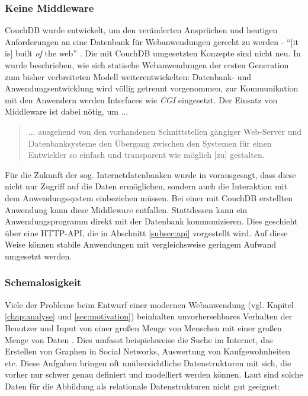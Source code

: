\subsubsection{Keine Middleware}

CouchDB wurde entwickelt, um den veränderten Ansprüchen und heutigen Anforderungen an eine Datenbank für Webanwendungen gerecht zu werden - \enquote{[it is] built \textit{of} the web} \cite{couch:oftheweb}. Die mit CouchDB umgesetzten Konzepte sind nicht neu. In  wurde beschrieben, wie sich statische Webanwendungen der ersten Generation zum bisher verbreiteten Modell weiterentwickelten: Datenbank- und Anwendungsentwicklung wird völlig getrennt vorgenommen, zur Kommunikation mit den Anwendern werden Interfaces wie \textit{CGI} \cite{w3c:cgi} eingesetzt. Der Einsatz von Middleware ist dabei nötig, um ...

 \begin{quote}
... ausgehend von den vorhandenen Schnittstellen gängiger Web-Server und Datenbanksysteme den Übergang zwischen den Systemen für einen Entwickler so einfach und transparent wie möglich [zu] gestalten. 
\end{quote}

Für die Zukunft der sog. Internetdatenbanken wurde in  vorausgesagt, dass diese nicht nur Zugriff auf die Daten ermöglichen, sondern auch die Interaktion mit dem Anwendungssystem einbeziehen müssen. Bei einer mit CouchDB erstellten Anwendung kann diese Middleware entfallen. Stattdessen kann ein Anwendungsprogramm direkt mit der Datenbank kommunizieren. Dies geschieht über eine HTTP-API, die in Abschnitt \ref{subsec:api} vorgestellt wird. Auf diese Weise können stabile Anwendungen mit vergleichsweise geringem Aufwand umgesetzt werden.


\subsubsection{Schemalosigkeit}


Viele der Probleme beim Entwurf einer modernen Webanwendung (vgl. Kapitel \ref{chap:analyse} und \ref{sec:motivation}) beinhalten unvorhersehbares Verhalten der Benutzer und Input von einer großen Menge von Menschen mit einer großen Menge von Daten . Dies umfasst beispielsweise die Suche im Internet, das Erstellen von Graphen in Social Networks, Auswertung von Kaufgewohnheiten etc. Diese Aufgaben bringen oft unübersichtliche Datenstrukturen mit sich, die vorher nur schwer genau definiert und modelliert werden können. Laut \cite{nobah} sind solche Daten für die Abbildung als relationale Datenstrukturen nicht gut geeignet:

